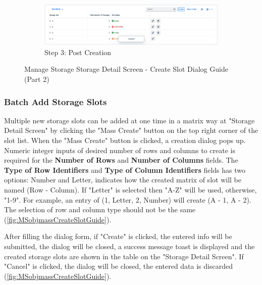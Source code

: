 \begin{figure}[htb]
    \ContinuedFloat
    \centering
    \begin{subfigure}{0.95\linewidth}
        \includegraphics[width=\linewidth]{images/user_doc/storage/updatedSlotEditDelete/singleSlotCreateToast.png}
        \caption{Step 3: Post Creation}
    \end{subfigure}
    
    \caption{Manage Storage Storage Detail Screen - Create Slot Dialog Guide (Part 2)}
    \label{fig:MSobjCreateSlotGuide2}
\end{figure}


\subsubsection{Batch Add Storage Slots}
\label{subsubsec:batchAddSlot}

Multiple new storage slots can be added at one time in a matrix way at "Storage Detail Screen" by clicking the "Mass Create" button on the top right corner of the slot list.
When the "Mass Create" button is clicked, a creation dialog pops up. Numeric integer inputs of desired number of rows and columns to create is required for the \textbf{Number of Rows} and \textbf{Number of Columns} fields. The \textbf{Type of Row Identifiers} and \textbf{Type of Column Identifiers} fields has two options: Number and Letter, indicates how the created matrix of slot will be named (Row - Column). If "Letter" is selected then "A-Z" will be used, otherwise, "1-9". For example, an entry of (1, Letter, 2, Number) will create (A - 1, A - 2). The selection of row and column type should not be the same (\autoref{fig:MSobjmassCreateSlotGuide}).

After filling the dialog form, if "Create" is clicked, the entered info will be submitted, the dialog will be closed, a success message toast is displayed and the created storage slots are shown in the table on the "Storage Detail Screen". If "Cancel" is clicked, the dialog will be closed, the entered data is discarded (\autoref{fig:MSobjmassCreateSlotGuide}).

